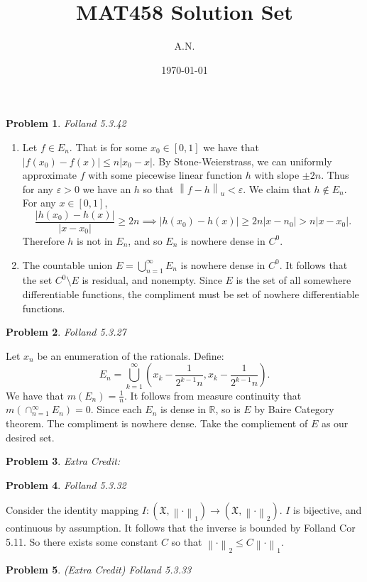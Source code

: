 \documentclass[12pt, a4paper]{article}
\title{MAT458 Solution Set}
\author{A.N.}
\date{\today}
\newtheorem{problem}{Problem}
\theoremstyle{definition}
\newcommand{\penum}{ \begin{enumerate}[label=\bf(\alph*), leftmargin=0pt]}
\newcommand{\epenum}{ \end{enumerate} }
\newcommand{\R}{\mathbb{R}}                           %
\newcommand{\ep}{\varepsilon}
\newcommand{\norm}[1]{\left\lVert#1\right\rVert}
\begin{document}
\maketitle
\newpage
\begin{problem}
	Folland 5.3.42
\end{problem}
\penum
\item Let $f\in E_n$. That is for some $x_0\in [0,1]$ we have that $|f(x_0)- f(x)| \leq n|x_0-x|$. By Stone-Weierstrass, we can uniformly approximate $f$ with some piecewise linear function $h$ with slope $\pm 2n$. Thus for any $\ep>0$ we have an $h$ so that $\norm{f-h}_u < \ep $. We claim that $h\not \in E_n$. For any $x\in [0,1]$, $$\frac{|h(x_0) - h(x)|}{|x-x_0|} \geq 2n \implies |h(x_0) - h(x)|\geq 2n|x-n_0|  > n|x-x_0|.$$ Therefore $h$ is not in $E_n$, and so $E_n$ is nowhere dense in $C^0$. 
\item The countable union $E = \bigcup_{n=1}^\infty E_n$ is nowhere dense in $C^0$. It follows that the set $C^0 \setminus E$  is residual, and nonempty. Since $E$ is the set of all somewhere differentiable functions, the compliment must be set of nowhere differentiable functions. 
\epenum 
\begin{problem}
	Folland 5.3.27
\end{problem}
Let $x_n$ be an enumeration of the rationals. Define: $$E_n = \bigcup_{k=1}^\infty \left(x_k - \frac{1}{2^{k-1} n} , x_k - \frac{1}{2^{k-1} n}\right).$$ We have that $m(E_n) = \frac{1}{n}$. It follows from measure continuity that $m\left( \cap_{n=1}^\infty E_n\right)=0$. Since each $E_n$ is dense in $\R$, so is $E$ by Baire Category theorem. The compliment is nowhere dense. Take the compliement of $E$ as our desired set. 
\begin{problem}
	Extra Credit: 
\end{problem}
\begin{problem}
	Folland 5.3.32
\end{problem}
Consider the identity mapping $I : \left( \mathfrak{X}, \norm{\cdot }_1\right) \to \left( \mathfrak{X}, \norm{\cdot}_2 \right)$. $I$ is bijective, and continuous by assumption. It follows that the inverse is bounded by Folland Cor 5.11. So there exists some constant $C$ so that $\norm{\cdot}_2 \leq C \norm{\cdot}_1$. 
\begin{problem}
	(Extra Credit) Folland 5.3.33
\end{problem}
\end{document}

